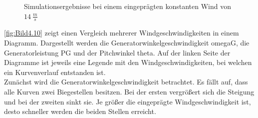\begin{figure}[H]
   \centering
   \caption[Simulationsergebnisse schneller konstanter Wind]{Simulationsergebnisse bei einem eingeprägten konstanten Wind von $\SI{14}{\frac{m}{s}}$}
   \label{fig:Bild4.9}
\end{figure}

\autoref{fig:Bild4.10} zeigt einen Vergleich mehrerer Windgeschwindigkeiten in einem Diagramm. Dargestellt werden die Generatorwinkelgeschwindigkeit \acs{omegaG}, die Generatorleistung \acs{PG} und der Pitchwinkel \acs{theta}. Auf der linken Seite der Diagramme ist jeweils eine Legende mit den Windgeschwindigkeiten, bei welchen ein Kurvenverlauf entstanden ist.\\
Zunächst wird die Generatorwinkelgeschwindigkeit betrachtet. Es fällt auf, dass alle Kurven zwei Biegestellen besitzen. Bei der ersten vergrößert sich die Steigung und bei der zweiten sinkt sie. Je größer die eingeprägte Windgeschwindigkeit ist, desto schneller werden die beiden Stellen erreicht. 

